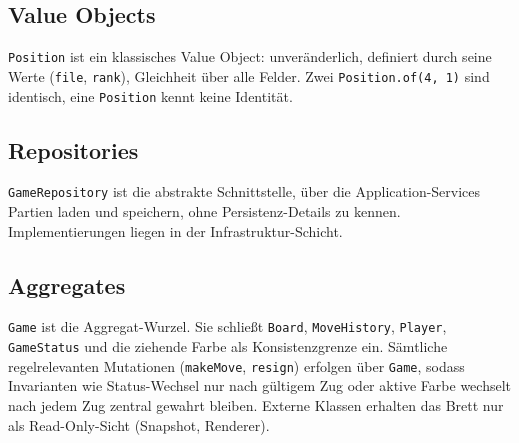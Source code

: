 \documentclass[a4paper,12pt]{article}
\begin{document}
\subsection*{Value Objects}

\texttt{Position} ist ein klassisches Value Object: unveränderlich, definiert durch seine Werte
(\texttt{file}, \texttt{rank}), Gleichheit über alle Felder. Zwei \texttt{Position.of(4, 1)} sind
identisch, eine \texttt{Position} kennt keine Identität.


\subsection*{Repositories}

\texttt{GameRepository} ist die abstrakte Schnittstelle, über die Application-Services Partien
laden und speichern, ohne Persistenz-Details zu kennen. Implementierungen liegen in der
Infrastruktur-Schicht.


\subsection*{Aggregates}

\texttt{Game} ist die Aggregat-Wurzel. Sie schließt \texttt{Board}, \texttt{MoveHistory},
\texttt{Player}, \texttt{GameStatus} und die ziehende Farbe als Konsistenzgrenze ein. Sämtliche
regelrelevanten Mutationen (\texttt{makeMove}, \texttt{resign}) erfolgen über \texttt{Game}, sodass
Invarianten wie \glqq{}Status-Wechsel nur nach gültigem Zug\grqq{} oder \glqq{}aktive Farbe
wechselt nach jedem Zug\grqq{} zentral gewahrt bleiben. Externe Klassen erhalten das Brett
nur als Read-Only-Sicht (Snapshot, Renderer).
\end{document}
